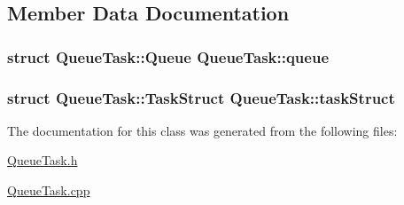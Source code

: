 \subsection{Member Data Documentation}
\subsubsection[{\texorpdfstring{queue}{queue}}]{\setlength{\rightskip}{0pt plus 5cm}struct {\bf Queue\+Task\+::\+Queue}  Queue\+Task\+::queue}\hypertarget{classQueueTask_a5dcac92fbafbc338f87bcf5f2b5b2919}{}\label{classQueueTask_a5dcac92fbafbc338f87bcf5f2b5b2919}
\subsubsection[{\texorpdfstring{task\+Struct}{taskStruct}}]{\setlength{\rightskip}{0pt plus 5cm}struct {\bf Queue\+Task\+::\+Task\+Struct}  Queue\+Task\+::task\+Struct}\hypertarget{classQueueTask_aa62b59622aa85704f0adedfd9a56ece2}{}\label{classQueueTask_aa62b59622aa85704f0adedfd9a56ece2}


The documentation for this class was generated from the following files\+:\begin{DoxyCompactItemize}
\item 
\hyperlink{QueueTask_8h}{Queue\+Task.\+h}\item 
\hyperlink{QueueTask_8cpp}{Queue\+Task.\+cpp}\end{DoxyCompactItemize}
